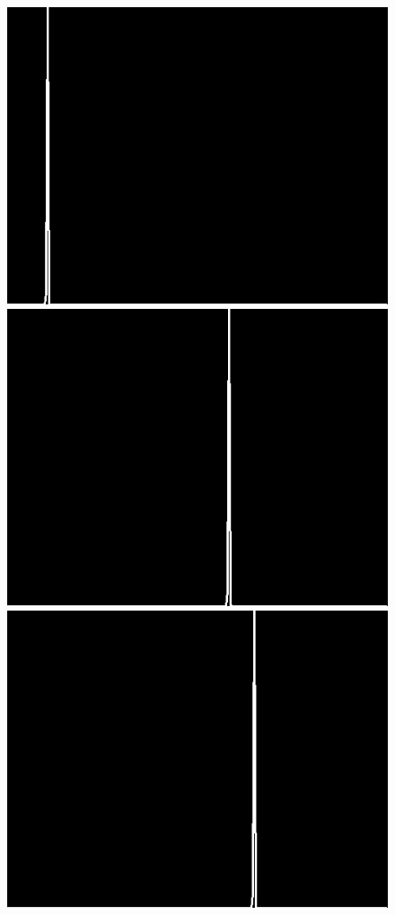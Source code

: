 \documentclass[12pt]{report}
\begin{document}
\begin{figure}[H]
\begin{center}
\includegraphics[scale=0.25]{../ImageRes/dct_histo_0.jpg} 
\includegraphics[scale=0.25]{../ImageRes/dct_histo_1.jpg} 
\includegraphics[scale=0.25]{../ImageRes/dct_histo_2.jpg} 

\end{center}
\end{figure}
\end{document}
